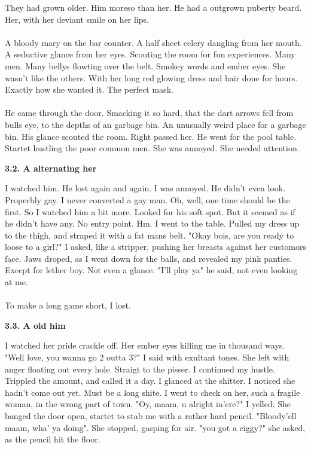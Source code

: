 \documentclass[]{article}
\begin{document}
They had grown older. Him moreso than her. He had a outgrown puberty beard. Her, with her deviant smile on her lips. 
\\ \\
A bloody mary on the bar counter. A half sheet celery dangling from her mouth. A seductive glance from her eyes. Scouting the room for fun experiences. Many men. Many bellys flowting over the belt. Smokey words and ember eyes. She wasn't like the others. With her long red glowing dress and hair done for hours. Exactly how she wanted it. The perfect mask. 
\\ \\
He came through the door. Smacking it so hard, that the dart arrows fell from bulls eye, to the depths of an garbage bin. An unusually weird place for a garbage bin. His glance scouted the room. Right passed her. He went for the pool table. Startet hustling the poor common men. She was annoyed. She needed attention. 

\begin{center}
	\textbf{3.2. A alternating her}
\end{center}

I watched him. He lost again and again. I was annoyed. He didn't even look. Properbly gay. I never converted a gay man. Oh, well, one time should be the first. So I watched him a bit more. Looked for his soft spot. But it seemed as if he didn't have any. No entry point. Hm. I went to the table. Pulled my dress up to the thigh, and straped it with a fat mans belt. "Okay bois, are you ready to loose to a girl?" I asked, like a stripper, pushing her breasts against her customors face. Jaws droped, as I went down for the balls, and revealed my pink panties. Execpt for lether boy. Not even a glance. "I'll play ya" he said, not even looking at me. 
\\ \\
To make a long game short, I lost.

\begin{center}
	\textbf{3.3. A old him}
\end{center}

I watched her pride crackle off. Her ember eyes killing me in thousand ways. "Well love, you wanna go 2 outta 3?" I said with exultant tones. She left with anger floating out every hole. Straigt to the pisser. I continued my hustle. Trippled the amount, and called it a day. I glanced at the shitter. I noticed she hadn't come out yet. Must be a long shite. I went to check on her, such a fragile woman, in the wrong part of town. "Oy, maam, u alright in'ere?" I yelled. She banged the door open, startet to stab me with a rather hard pencil. "Bloody'ell maam, wha' ya doing". She stopped, gasping for air. "you got a ciggy?" she asked, as the pencil hit the floor. 
\end{document}

